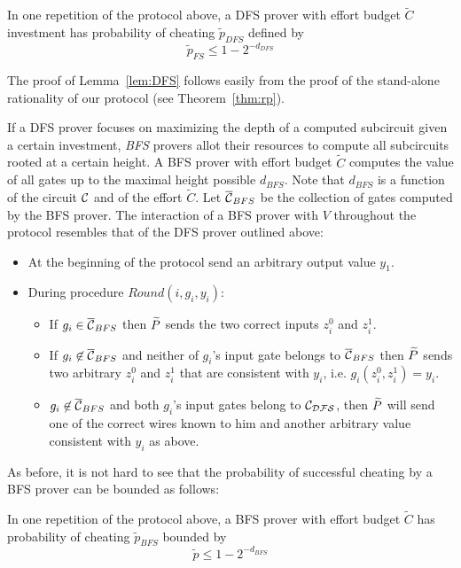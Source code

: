\begin{lemma}
\label{lem:DFS}
In one repetition of the protocol above, a DFS prover with effort budget $\tilde{C}$ investment has probability of cheating $\tilde{p}_{DFS}$ defined by 
$$ \tilde{p}_{FS} \leq 1 - 2^{-d_{DFS}}$$
\end{lemma}

The proof of Lemma~\ref{lem:DFS} follows easily from the proof of the stand-alone rationality of our protocol (see Theorem~\ref{thm:rp}). 

If a DFS prover focuses on maximizing the depth of a computed subcircuit given a certain investment, \emph{BFS} provers allot their resources to compute all subcircuits rooted at a certain height.
A BFS prover with effort budget $\tilde{C}$ computes the value of all gates up to the maximal height possible $d_{BFS}$. Note that $d_{BFS}$ is 
a function of the circuit $\cal C$ and of the effort $\tilde{C}$.  Let $ \overline{\cal{C}}_{BFS}$ be the 
collection of gates computed by the BFS prover. 
The interaction of a BFS prover with $V$ throughout the protocol resembles that of the DFS prover outlined above:
\begin{itemize}
	\item At the beginning of the protocol send an arbitrary output value $y_1$.
	\item During procedure $Round(i, g_i, y_i)$:
	\begin{itemize}
		\item If $g_i \in \overline{\cal{C}}_{BFS}$  then $\widetilde{P}$ sends the two correct inputs $z^0_i$ and $z^1_i$.
		\item If $g_i \not \in \overline{\cal{C}}_{BFS}$ and neither of $g_i$'s input gate belongs to $\overline{\cal{C}}_{BFS}$ then $\widetilde{P}$ sends two arbitrary $z^0_i$ and $z^1_i$ that are consistent with $y_i$, i.e. $g_i(z^0_i,z^1_i) = y_i$.
		\item $g_i \not \in \overline{\cal{C}}_{BFS}$ and both $g_i$'s input gates belong to $\cal{C}_{DFS}$, then $\widetilde{P}$ will send one of the correct wires known to him and another arbitrary value consistent with $y_i$ as above.
	\end{itemize} 
\end{itemize}
As before, it is not hard to see that the probability of successful cheating by a BFS prover can be bounded as follows: 

\begin{lemma}
\label{lem:BFS}
	In one repetition of the protocol above, a BFS prover with effort budget $\tilde{C}$ has probability of cheating $\tilde{p}_{BFS}$ bounded by
	$$ \tilde{p} \leq 1 - 2^{-d_{BFS}}$$
\end{lemma}

